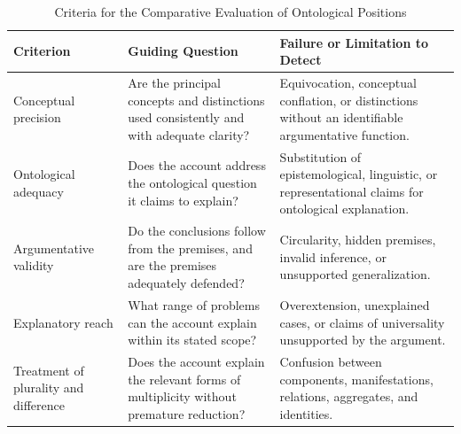 

\begin{table}[htbp]
\centering
\caption{Criteria for the Comparative Evaluation of Ontological Positions}
\label{tab:ch08-comparative-evaluation-criteria}

\small
\renewcommand{\arraystretch}{1.3}

\begin{tabular}{|p{}|p{}|p{}|}
\hline
\textbf{Criterion}
&
\textbf{Guiding Question}
&
\textbf{Failure or Limitation to Detect}
\\
\hline

Conceptual precision
&
Are the principal concepts and distinctions used consistently and with adequate clarity?
&
Equivocation, conceptual conflation, or distinctions without an identifiable argumentative function.
\\
\hline

Ontological adequacy
&
Does the account address the ontological question it claims to explain?
&
Substitution of epistemological, linguistic, or representational claims for ontological explanation.
\\
\hline

Argumentative validity
&
Do the conclusions follow from the premises, and are the premises adequately defended?
&
Circularity, hidden premises, invalid inference, or unsupported generalization.
\\
\hline

Explanatory reach
&
What range of problems can the account explain within its stated scope?
&
Overextension, unexplained cases, or claims of universality unsupported by the argument.
\\
\hline

Treatment of plurality and difference
&
Does the account explain the relevant forms of multiplicity without premature reduction?
&
Confusion between components, manifestations, relations, aggregates, and identities.
\\
\hline


\end{tabular}
\end{table}
